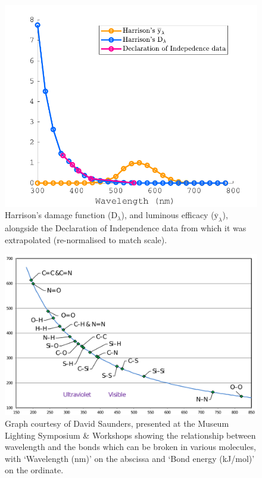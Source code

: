 \begin{figure}[htbp]
\includegraphics[max width=\textwidth]{figs/LitRev/HarrisonInd.pdf}
\caption{Harrison's \citep{harrison_report_1953} damage function ($\mathrm{D}_{\lambda}$), and luminous efficacy ($\overline{\mathrm{y}}_{\lambda}$), alongside the Declaration of Independence data \citep{national_bureau_of_standards_preservation_1951} from which it was extrapolated (re-normalised to match scale).}
\label{fig:Harrison}
\end{figure}

\begin{figure}[htbp]
\includegraphics[max width=\textwidth]{figs/LitRev/Saunders.pdf}
\caption{Graph courtesy of David Saunders, presented at the Museum Lighting Symposium \& Workshops \citep[p.61]{pokorska_book_2017} showing the relationship between wavelength and the bonds which can be broken in various molecules, with `Wavelength (nm)' on the abscissa and `Bond energy (kJ/mol)' on the ordinate.}
\label{fig:Saunders}
\end{figure}

